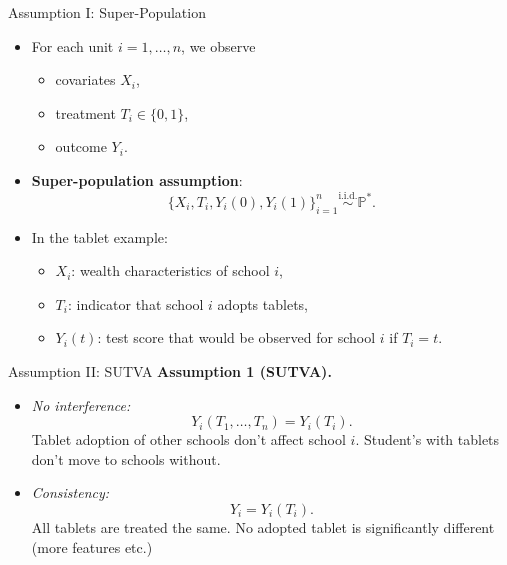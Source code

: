 \documentclass[10pt]{beamer}
\theoremstyle{plain}
\begin{document}
\begin{frame}{Assumption I: Super-Population}
  \begin{itemize}
    \item For each unit \(i=1,\dots,n\), we observe 
    \begin{itemize}
        \item covariates \(X_i\),
        \item treatment \(T_i \in \{0, 1\}\),
        \item outcome \(Y_i\).
    \end{itemize}
    \pause
    \item \textbf{Super-population assumption}:
    \[
      \{X_i, T_i, Y_i(0), Y_i(1)\}_{i=1}^n \overset{\text{i.i.d.}}{\sim} \mathbb{P}^*.
    \]
    \pause
    \item In the tablet example:
    \begin{itemize}
      \item \(X_i\): wealth characteristics of school \(i\),
      \item \(T_i\): indicator that school \(i\) adopts tablets,
      \item \(Y_i(t)\): test score that would be observed for school \(i\) if \(T_i=t\).
    \end{itemize}
  \end{itemize}
\end{frame}

\begin{frame}{Assumption II: SUTVA}
  \textbf{Assumption 1 (SUTVA).}
  \begin{itemize}
    \item \emph{No interference:}
    \[
      Y_i(T_1,\dots,T_n) = Y_i(T_i).
    \]
    Tablet adoption of other schools don't affect school $i$. Student's with tablets don't move to schools without.
    \vspace{0.5em}
    \pause
    \item \emph{Consistency:}
    \[
      Y_i = Y_i(T_i).
    \]
    All tablets are treated the same. No adopted tablet is significantly different (more features etc.)
  \end{itemize}
\end{frame}
\end{document}
